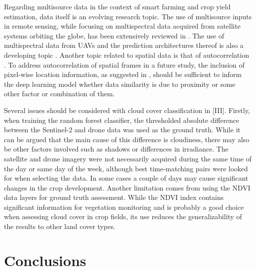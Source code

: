Regarding multisource data in the context of smart farming and crop yield estimation, data itself is an evolving research topic. The use of multisource inputs in remote sensing, while focusing on multispectral data acquired from satellite systems orbiting the globe, has been extensively reviewed in \cite{Ghamisi2019}. The use of multispectral data from UAVs and the prediction architectures thereof is also a developing topic \cite{Messina2020}. Another topic related to spatial data is that of autocorrelation \cite{Amgalan2020}. To address autocorrelation of spatial frames in a future study, the inclusion of pixel-wise location information, as suggested in \cite{Amgalan2020}, should be sufficient to inform the deep learning model whether data similarity is due to proximity or some other factor or combination of them.

Several issues should be considered with cloud cover classification in [III]. Firstly, when training the random forest classifier, the thresholded absolute difference between the Sentinel-2 and drone data was used as the ground truth. While it can be argued that the main cause of this difference is cloudiness, there may also be other factors involved such as shadows or differences in irradiance. The satellite and drone imagery were not necessarily acquired during the same time of the day or same day of the week, although best time-matching pairs were looked for when selecting the data. In some cases a couple of days may cause significant changes in the crop development. Another limitation comes from using the NDVI data layers for ground truth assessment. While the NDVI index contains significant information for vegetation monitoring and is probably a good choice when assessing cloud cover in crop fields, its use reduces the generalizability of the results to other land cover types. 

\section{Conclusions}

